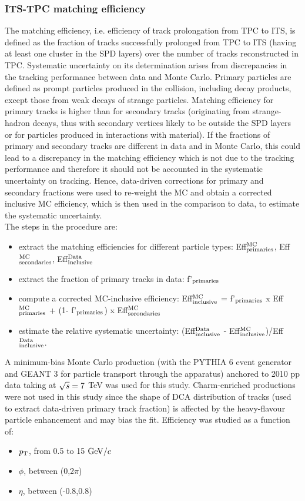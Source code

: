 \subsubsection{ITS-TPC matching efficiency}
\label{sec:MEpp}
The matching efficiency, i.e. efficiency of track prolongation from TPC to ITS, 
is defined as the fraction of tracks successfully prolonged from TPC to ITS (having
at least one cluster in the SPD layers)
over the number of tracks reconstructed in TPC.
Systematic uncertainty on its determination arises from discrepancies 
in the tracking performance between data and Monte Carlo.
Primary particles are defined as 
prompt particles produced in the collision, including decay products, 
except those from weak decays of strange particles. Matching efficiency for primary tracks is higher than 
for secondary tracks (originating from strange-hadron decays, thus 
with secondary vertices likely to be outside the SPD layers or for particles produced
in interactions with material). 
If the fractions of primary and secondary tracks are different in data 
and in Monte Carlo, this could lead to a discrepancy in the matching efficiency
which is not due to the tracking performance and therefore it should not be
accounted in the systematic uncertainty on tracking. Hence,
data-driven corrections for primary and secondary fractions were used to re-weight the MC
and obtain a corrected inclusive MC efficiency, which is then used in the
comparison to data, to estimate the systematic uncertainty.\\
The steps in the procedure are:
\begin{itemize}
\item extract the matching efficiencies for different particle types: 
Eff$^{\rm MC}_{\rm primaries}$, Eff$^{\rm MC}_{\rm secondaries}$, Eff$^{\rm Data}_{\rm inclusive}$
\item extract the fraction of primary tracks in data: f'$_{\rm primaries}$
\item compute a corrected MC-inclusive efficiency: 
Eff$^{\rm MC}_{\rm inclusive}$ = f'$_{\rm primaries}$ x Eff$^{\rm MC}_{\rm primaries}$ + (1- f'$_{\rm primaries}$) x Eff$^{\rm MC}_{\rm secondaries}$
\item estimate the relative systematic uncertainty: 
(Eff$^{\rm Data}_{\rm inclusive}$ - Eff$^{\rm MC}_{\rm inclusive}$)/Eff$^{\rm Data}_{\rm inclusive}$.
\end{itemize}
A minimum-bias Monte Carlo production (with the PYTHIA 6 event generator and
GEANT 3 for particle transport through the apparatus) anchored to 2010 pp data taking at 
$\sqrt{s} = 7$ TeV was used for this study. Charm-enriched productions were not used in this study 
since the shape of DCA distribution of tracks (used to extract data-driven 
primary track fraction) is affected by the heavy-flavour particle enhancement
and may bias the fit.
Efficiency was studied as a function of:
\begin{itemize}
\item $p_{\rm T}$, from 0.5 to 15 $\mathrm{GeV}/c$
\item $\phi$, between (0,2$\pi$)
\item $\eta$, between (-0.8,0.8)
\end{itemize}

